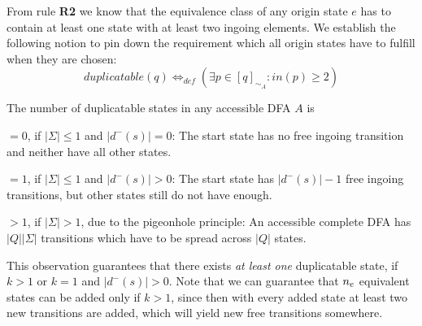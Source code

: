 From rule \textbf{R2} we know that the equivalence class of any origin state $e$ has to contain at least one state with at least two ingoing elements. We establish the following notion to pin down the requirement which all origin states have to fulfill when they are chosen:
\begin{equation}\label{eq:dupl}
duplicatable(q) \Leftrightarrow_{def} (\exists p \in [q]_{\sim_A}\colon in(p)\ge 2)
\end{equation}
\begin{observation}
	The number of duplicatable states in any accessible DFA $A$ is
	\begin{description}
		\item$= 0$, if $|\Sigma| \leq 1$ and $|d^-(s)| = 0$: The start state has no free ingoing transition and neither have all other states.
		
		\item$= 1$, if $|\Sigma| \leq 1$ and $|d^-(s)| > 0$: The start state has $|d^-(s)| - 1$ free ingoing transitions, but other states still do not have enough.
		
		\item$> 1$, if $|\Sigma| > 1$, due to the pigeonhole principle: An accessible complete DFA has $|Q||\Sigma|$ transitions which have to be spread across $|Q|$ states.
	\end{description}
\end{observation}
\noindent This observation guarantees that there exists \emph{at least one} duplicatable state, if $k > 1$ or $k = 1$ and $|d^-(s)| > 0$. Note that we can guarantee that ${n_e}$ equivalent states can be added only if $k > 1$, since then with every added state at least two new transitions are added, which will yield new free transitions somewhere.

